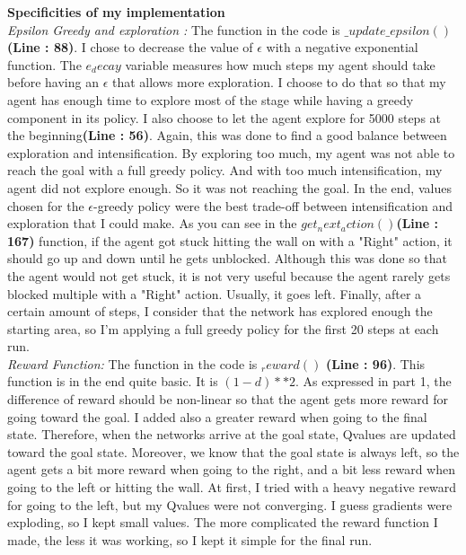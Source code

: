 \documentclass{article}[12pt]
\begin{document}
\textbf{Specificities of my implementation\\}
\textit{Epsilon Greedy and exploration :} The function in the code is $\_update\_epsilon()$ \textbf{(Line : 88)}. I chose to decrease the value of $\epsilon$ with a negative exponential function. The $e_decay$ variable measures how much steps my agent should take before having an $\epsilon$ that allows more exploration. I choose to do that so that my agent has enough time to explore most of the stage while having a greedy component in its policy. I also choose to let the agent explore for 5000 steps at the beginning\textbf{(Line : 56)}. Again, this was done to find a good balance between exploration and intensification. By exploring too much, my agent was not able to reach the goal with a full greedy policy. And with too much intensification, my agent did not explore enough. So it was not reaching the goal. In the end, values chosen for the $\epsilon$-greedy policy were the best trade-off between intensification and exploration that I could make. As you can see in the $get_next_action()$\textbf{(Line : 167)} function, if the agent got stuck hitting the wall on with a "Right" action, it should go up and down until he gets unblocked. Although this was done so that the agent would not get stuck, it is not very useful because the agent rarely gets blocked multiple with a "Right" action. Usually, it goes left. Finally, after a certain amount of steps, I consider that the network has explored enough the starting area, so I'm applying a full greedy policy for the first 20 steps at each run. \\

\textit{Reward Function: }The function in the code is $_reward()$ \textbf{(Line : 96)}. This function is in the end quite basic. It is $(1-d)**2$. As expressed in part 1, the difference of reward should be non-linear so that the agent gets more reward for going toward the goal. I added also a greater reward when going to the final state. Therefore, when the networks arrive at the goal state, Qvalues are updated toward the goal state. Moreover, we know that the goal state is always left, so the agent gets a bit more reward when going to the right, and a bit less reward when going to the left or hitting the wall. At first, I tried with a heavy negative reward for going to the left, but my Qvalues were not converging. I guess gradients were exploding, so I kept small values. The more complicated the reward function I made, the less it was working, so I kept it simple for the final run. \\
\end{document}
